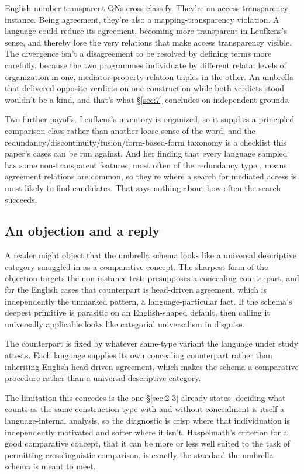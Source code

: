 English number-transparent QNs cross-classify. They're an access-transparency instance. Being agreement, they're also a mapping-transparency violation. A language could reduce its agreement, becoming more transparent in Leufkens's sense, and thereby lose the very relations that make access transparency visible. The divergence isn't a disagreement to be resolved by defining terms more carefully, because the two programmes individuate by different relata: levels of organization in one, mediator-property-relation triples in the other. An umbrella that delivered opposite verdicts on one construction while both verdicts stood wouldn't be a kind, and that's what §\ref{sec:7} concludes on independent grounds.

Two further payoffs. Leufkens's inventory is organized, so it supplies a principled comparison class rather than another loose sense of the word, and the redundancy/discontinuity/fusion/form-based-form taxonomy is a checklist this paper's cases can be run against. And her finding that every language sampled has some non-transparent features, most often of the redundancy type \autocite{leufkens2015}, means agreement relations are common, so they're where a search for mediated access is most likely to find candidates. That says nothing about how often the search succeeds.

\subsection{An objection and a reply}\label{sec:6-objection}

A reader might object that the umbrella schema looks like a universal descriptive category smuggled in as a comparative concept. The sharpest form of the objection targets the non-instance test:  presupposes a concealing counterpart, and for the English cases that counterpart is head-driven agreement, which is independently the unmarked pattern, a language-particular fact. If the schema's deepest primitive is parasitic on an English-shaped default, then calling it universally applicable looks like categorial universalism in disguise.

The counterpart is fixed by whatever same-type variant the language under study attests. Each language supplies its own concealing counterpart rather than inheriting English head-driven agreement, which makes the schema a comparative procedure rather than a universal descriptive category.

The limitation this concedes is the one §\ref{sec:2-3} already states: deciding what counts as the same construction-type with and without concealment is itself a language-internal analysis, so the diagnostic is crisp where that individuation is independently motivated and softer where it isn't. Haspelmath's \autocite*[665]{haspelmath-2010-comparative-concepts} criterion for a good comparative concept, that it can be more or less well suited to the task of permitting crosslinguistic comparison, is exactly the standard the umbrella schema is meant to meet.

